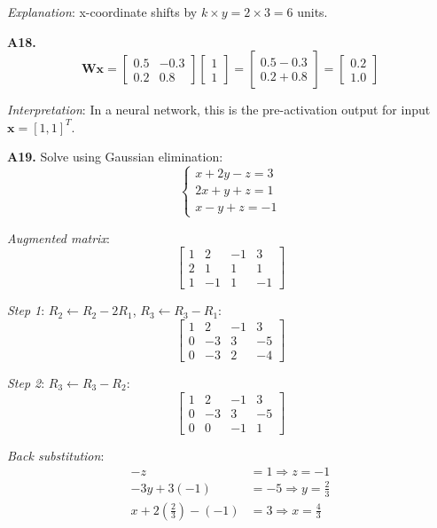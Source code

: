\documentclass[12pt,a4paper]{article}
\theoremstyle{definition}
\begin{document}
\textit{Explanation}: x-coordinate shifts by $k \times y = 2 \times 3 = 6$ units.

\textbf{A18.}
\[
\mathbf{Wx} = \begin{bmatrix} 0.5 & -0.3 \\ 0.2 & 0.8 \end{bmatrix} \begin{bmatrix} 1 \\ 1 \end{bmatrix} = \begin{bmatrix} 0.5 - 0.3 \\ 0.2 + 0.8 \end{bmatrix} = \begin{bmatrix} 0.2 \\ 1.0 \end{bmatrix}
\]

\textit{Interpretation}: In a neural network, this is the pre-activation output for input $\mathbf{x} = [1, 1]^T$.

\textbf{A19.} Solve using Gaussian elimination:
\[
\begin{cases}
x + 2y - z = 3 \\
2x + y + z = 1 \\
x - y + z = -1
\end{cases}
\]

\textit{Augmented matrix}:
\[
\left[\begin{array}{ccc|c}
1 & 2 & -1 & 3 \\
2 & 1 & 1 & 1 \\
1 & -1 & 1 & -1
\end{array}\right]
\]

\textit{Step 1}: $R_2 \leftarrow R_2 - 2R_1$, $R_3 \leftarrow R_3 - R_1$:
\[
\left[\begin{array}{ccc|c}
1 & 2 & -1 & 3 \\
0 & -3 & 3 & -5 \\
0 & -3 & 2 & -4
\end{array}\right]
\]

\textit{Step 2}: $R_3 \leftarrow R_3 - R_2$:
\[
\left[\begin{array}{ccc|c}
1 & 2 & -1 & 3 \\
0 & -3 & 3 & -5 \\
0 & 0 & -1 & 1
\end{array}\right]
\]

\textit{Back substitution}:
\begin{align*}
-z &= 1 \Rightarrow z = -1 \\
-3y + 3(-1) &= -5 \Rightarrow y = \frac{2}{3} \\
x + 2(\frac{2}{3}) - (-1) &= 3 \Rightarrow x = \frac{4}{3}
\end{align*}
\end{document}
